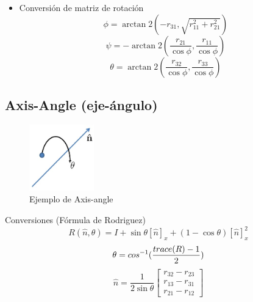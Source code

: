 \documentclass[main.tex]{subfiles}
\begin{document}
\begin{itemize}
\item Conversión de matriz de rotación
  \begin{equation}
    \phi=\arctan 2(-r_{31},\sqrt{r_{11}^2+r_{21}^2})
  \end{equation}
  \begin{equation}
    \psi=-\arctan 2(\frac{r_{21}}{\cos\phi},\frac{r_{11}}{\cos\phi})
  \end{equation}
  \begin{equation}
    \theta=\arctan 2(\frac{r_{32}}{\cos\phi},\frac{r_{33}}{\cos\phi})
  \end{equation}
\end{itemize}

\subsection{Axis-Angle (eje-ángulo)}

\begin{figure}[h]
  \centering
  \includegraphics[width=0.25\textwidth]{../img/axisang.jpg}
  \caption{Ejemplo de Axis-angle}
  \label{axisang}
\end{figure}

Conversiones (Fórmula de Rodriguez)
\begin{equation}
  R(\hat{n},\theta) = I +
      \sin\theta\left [ \hat{n} \right ]_{x}
      +(1-\cos\theta)\left [ \hat{n} \right ]_{x}^2
\end{equation}
\begin{equation}
  \theta=\\cos^{-1}(\frac{trace(R)-1}{2})
\end{equation}
\begin{equation}
  \hat{n} = \frac{1}{2\sin\theta}
            \begin{bmatrix}
              r_{32}-r_{23}\\ 
              r_{13}-r_{31}\\ 
              r_{21}-r_{12}
            \end{bmatrix}
\end{equation}
\end{document}
